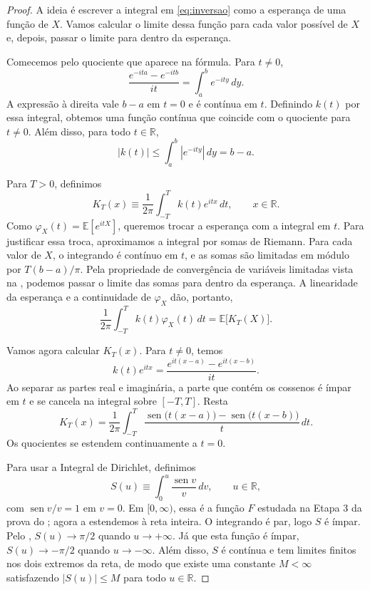 \documentclass[12pt,portuguese]{article}
\theoremstyle{definition}
\theoremstyle{plainexercise}
\theoremstyle{starredexercise}
\theoremstyle{definition}
\renewcommand{\sin}{\operatorname{sen}}
\begin{document}
\begin{proof}
A ideia é escrever a integral em \eqref{eq:inversao} como a esperança de uma
função de $X$. Vamos calcular o limite dessa função para cada valor possível
de $X$ e, depois, passar o limite para dentro da esperança.

Comecemos pelo quociente que aparece na fórmula. Para $t\neq0$,
\[
\frac{e^{-ita}-e^{-itb}}{it}=\int_a^b e^{-ity}\,dy.
\]
A expressão à direita vale $b-a$ em $t=0$ e é contínua em $t$. Definindo
$k(t)$ por essa integral, obtemos uma função contínua que coincide com o
quociente para $t\neq0$. Além disso, para todo $t\in\mathbb{R}$,
\[
|k(t)|\leqslant\int_a^b|e^{-ity}|\,dy=b-a.
\]

Para $T>0$, definimos
\[
K_T(x)\equiv\frac{1}{2\pi}\int_{-T}^{T}k(t)e^{itx}\,dt,
\qquad x\in\mathbb{R}.
\]
Como $\varphi_X(t)=\mathbb{E}[e^{itX}]$, queremos trocar a esperança com a
integral em $t$. Para justificar essa troca, aproximamos a integral por somas
de Riemann. Para cada valor de $X$, o integrando é contínuo em $t$, e as
somas são limitadas em módulo por $T(b-a)/\pi$. Pela propriedade de
convergência de variáveis limitadas vista na ,
podemos passar o limite das somas para dentro da esperança. A linearidade da
esperança e a continuidade de $\varphi_X$ dão, portanto,
\begin{equation}\label{eq:IT}
\frac{1}{2\pi}\int_{-T}^{T}k(t)\varphi_X(t)\,dt
=\mathbb{E}\bigl[K_T(X)\bigr].
\end{equation}

Vamos agora calcular $K_T(x)$. Para $t\neq0$, temos
\[
k(t)e^{itx}
=\frac{e^{it(x-a)}-e^{it(x-b)}}{it}.
\]
Ao separar as partes real e imaginária, a parte que contém os cossenos é
ímpar em $t$ e se cancela na integral sobre $[-T,T]$. Resta
\[
K_T(x)
=\frac{1}{2\pi}\int_{-T}^{T}
\frac{\sin\bigl(t(x-a)\bigr)-\sin\bigl(t(x-b)\bigr)}{t}\,dt.
\]
Os quocientes se estendem continuamente a $t=0$.

Para usar a Integral de Dirichlet, definimos
\[
S(u)\equiv\int_0^u\frac{\sin v}{v}\,dv,
\qquad u\in\mathbb{R},
\]
com $\sin v/v=1$ em $v=0$. Em $[0,\infty)$, essa é a função $F$ estudada na
Etapa 3 da prova do ; agora a estendemos à reta inteira.
O integrando é par, logo $S$ é ímpar. Pelo
, $S(u)\to\pi/2$ quando $u\to+\infty$. Já que esta função é ímpar,
$S(u)\to-\pi/2$ quando $u\to-\infty$. Além disso, $S$ é contínua e tem
limites finitos nos dois extremos da reta, de modo que existe uma constante
$M<\infty$ satisfazendo $|S(u)|\leqslant M$ para todo $u\in\mathbb{R}$.


\end{proof}
\end{document}
